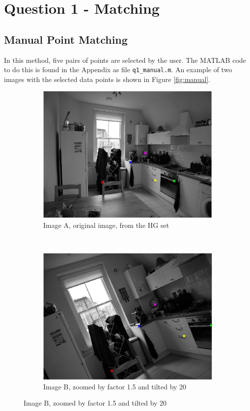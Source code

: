 \documentclass[a4paper, 10pt, conference]{ieeeconf}
\begin{document}
\section{Question 1 - Matching}
\subsection{Manual Point Matching}

In this method, five pairs of points are selected by the user. The MATLAB code to do this is found in the Appendix as file \texttt{q1\_manual.m}. An example of two images with the selected data points is shown in Figure \ref{fig:manual}.

\begin{figure}[!ht]
  \captionsetup[subfigure]{position=b}
  \centering
    \begin{subfigure}{0.45\linewidth}
      \includegraphics[width=\textwidth]{pic/manualA}
      \caption{Image A, original image, from the HG set}
      \label{fig:manualA}
    \end{subfigure}
    ~
    \begin{subfigure}{0.45\linewidth}
      \includegraphics[width=\textwidth]{pic/manualB}
      \caption{Image B, zoomed by factor 1.5 and tilted by 20\degree}
      \label{fig:manualB}
    \end{subfigure}


\end{figure}
\end{document}
